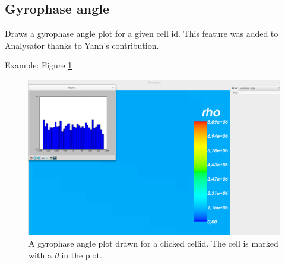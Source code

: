 \documentclass[a4paper,10pt]{article}
\begin{document}
\subsection{Gyrophase angle}

Draws a gyrophase angle plot for a given cell id. This feature was added to Analysator thanks to Yann's 
contribution.

Example: Figure \ref{fig:gyrophase_angle}

\begin{figure}[H]
 \centering
 \includegraphics[width=\textwidth]{../../images/gyrophase_angle.png}
 \caption{A gyrophase angle plot drawn for a clicked cellid. The cell is marked with a \emph{0} in the plot.}
 \label{fig:gyrophase_angle}
\end{figure}
\end{document}
